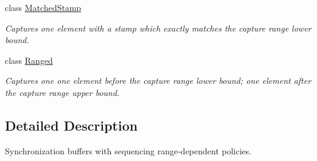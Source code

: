 \begin{DoxyCompactItemize}
class \hyperlink{classflow_1_1follower_1_1_matched_stamp}{Matched\+Stamp}
\begin{DoxyCompactList}\small\item\em Captures one element with a stamp which exactly matches the capture range lower bound. \end{DoxyCompactList}\item 
class \hyperlink{classflow_1_1follower_1_1_ranged}{Ranged}
\begin{DoxyCompactList}\small\item\em Captures one one element before the capture range lower bound; one element after the capture range upper bound. \end{DoxyCompactList}\end{DoxyCompactItemize}


\subsection{Detailed Description}
Synchronization buffers with sequencing range-\/dependent policies. 